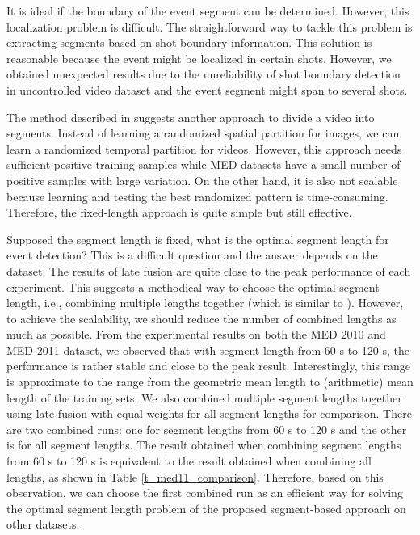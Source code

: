 It is ideal if the boundary of the event segment can be determined. However, this localization problem is difficult. The straightforward way to tackle this problem is extracting segments based on shot boundary information. This solution is reasonable because the event might be localized in certain shots. However, we obtained unexpected results due to the unreliability of shot boundary detection in uncontrolled video dataset and the event segment might span to several shots.

The method described in \cite{DBLP:conf/eccv/JiangYY12} suggests another approach to divide a video into segments. Instead of learning a randomized spatial partition for images, we can learn a randomized temporal partition for videos. However, this approach needs sufficient positive training samples while MED datasets have a small number of positive samples with large variation. On the other hand, it is also not scalable because learning and testing the best randomized pattern is time-consuming. Therefore, the fixed-length approach is quite simple but still effective.

Supposed the segment length is fixed, what is the optimal segment length for event detection? This is a difficult question and the answer depends on the dataset. The results of late fusion are quite close to the peak performance of each experiment. This suggests a methodical way to choose the optimal segment length, i.e., combining multiple lengths together (which is similar to \cite{DBLP:conf/eccv/JiangYY12}). However, to achieve the scalability, we should reduce the number of combined lengths as much as possible. From the experimental results on both the MED 2010 and MED 2011 dataset, we observed that with segment length from 60 s to 120 s, the performance is rather stable and close to the peak result. Interestingly, this range is approximate to the range from the geometric mean length to (arithmetic) mean length of the training sets. We also combined multiple segment lengths together using late fusion with equal weights for all segment lengths for comparison. There are two combined runs: one for segment lengths from 60 s to 120 s and the other is for all segment lengths. The result obtained when combining segment lengths from 60 s to 120 s is equivalent to the result obtained when combining all lengths, as shown in Table \ref{t_med11_comparison}. Therefore, based on this observation, we can choose the first combined run as an efficient way for solving the optimal segment length problem of the proposed segment-based approach on other datasets.

